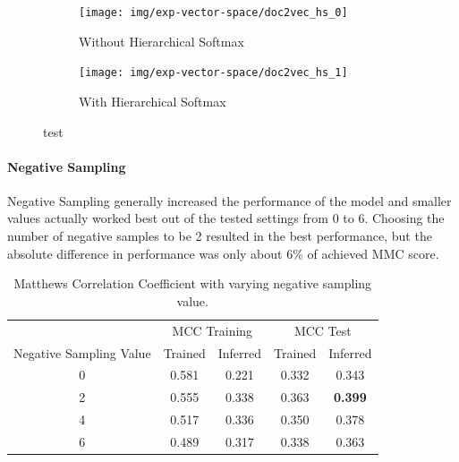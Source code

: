 \begin{figure}[h!]
    \centering
    \begin{subfigure}[b]{0.49\textwidth}
      \texttt{[image: img/exp-vector-space/doc2vec\_hs\_0]}
      \caption{Without Hierarchical Softmax}
\label{fig:doc2vec_hs_0}
    \end{subfigure}
    \begin{subfigure}[b]{0.49\textwidth}
      \texttt{[image: img/exp-vector-space/doc2vec\_hs\_1]}
    \caption{With Hierarchical Softmax}
\label{fig:doc2vec_hs_1}
    \end{subfigure}
\caption{test}
\label{fig:doc2vec_hs}
\end{figure}

\paragraph{Negative Sampling}
Negative Sampling generally increased the performance of the model and smaller values actually worked best out of the tested settings from 0 to 6. Choosing the number of negative samples to be 2 resulted in the best performance, but the absolute difference in performance was only about 6\% of achieved MMC score.

\begin{table}[h]
  \begin{center}
    \begin{tabular}{ c | *2c | *2c }
      \toprule
       & \multicolumn{2}{c|}{MCC Training} & \multicolumn{2}{|c}{MCC Test}\\
      Negative Sampling Value & Trained & Inferred & Trained & Inferred \\
      \midrule
      0 & 0.581 & 0.221 & 0.332 & 0.343 \\
      2 & 0.555 & 0.338 & 0.363 & \textbf{0.399} \\
      4 & 0.517 & 0.336 & 0.350 & 0.378 \\
      6 & 0.489 & 0.317 & 0.338 & 0.363 \\
    \bottomrule
  \end{tabular}
  \caption{Matthews Correlation Coefficient with varying negative sampling value.}
\label{tab:Paragraph Vector Parameter Results Negative Sampling}
\end{center}

\end{table}

